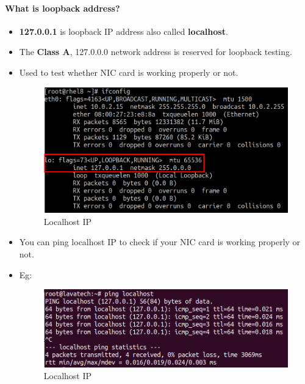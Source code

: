 \setlength{\columnsep}{3pt}
\begin{flushleft}

\paragraph{What is loopback address?}
\begin{itemize}
	\item \textbf{127.0.0.1} is loopback IP address also called \textbf{localhost}.
	\item The \textbf{Class A}, 127.0.0.0 network address is reserved for loopback testing.
	\item Used to test whether NIC card is working properly or not.
	\begin{figure}[h!]
		\centering
		\includegraphics[scale=.28]{content/chapter14/images/loopback.png}
		\caption{Localhost IP}
		\label{fig:localhost_new}
	\end{figure}	

	\item You can ping localhost IP to check if your NIC card is working properly or not.
	\item Eg:
	\begin{figure}[h!]
		\centering
		\includegraphics[scale=.35]{content/chapter14/images/ping.png}
		\caption{Localhost IP}
		\label{fig:localhost_new}
	\end{figure}	
\end{itemize}


\end{flushleft}
